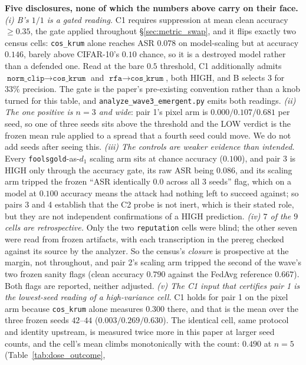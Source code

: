 \documentclass{article}
\begin{document}
\noindent \textbf{Five disclosures, none of which the numbers above carry on their face.}
\emph{(i) B's $1/1$ is a gated reading.} C1 requires suppression at mean clean accuracy
$\ge 0.35$, the gate applied throughout §\ref{sec:metric_swap}, and it flips exactly two census cells:
\texttt{cos\_krum} alone reaches ASR $0.078$ on model-scaling but at accuracy $0.146$, barely above
CIFAR-10's $0.10$ chance, so it is a destroyed model rather than a defended one. Read at the bare
$0.5$ threshold, C1 additionally admits $\texttt{norm\_clip}\to\texttt{cos\_krum}$ and
$\texttt{rfa}\to\texttt{cos\_krum}$, both HIGH, and B selects $3$ for $33\%$ precision. The gate is
the paper's pre-existing convention rather than a knob turned for this table, and
\texttt{analyze\_wave3\_emergent.py} emits both readings. \emph{(ii) The one positive is $n{=}3$ and
wide}: pair 1's pixel arm is $0.000/0.107/0.681$ per seed, so one of three seeds sits above the
threshold and the LOW verdict is the frozen mean rule applied to a spread that a fourth seed could
move. We do not add seeds after seeing this. \emph{(iii) The controls are weaker evidence than
intended.} Every \texttt{foolsgold}-as-$d_1$ scaling arm sits at chance accuracy ($0.100$), and pair
3 is HIGH only through the accuracy gate, its raw ASR being $0.086$, and its scaling arm tripped the
frozen ``ASR identically $0.0$ across all $3$ seeds'' flag, which on a model at $0.100$ accuracy means
the attack had nothing left to succeed against; so pairs 3 and 4 establish that
the C2 probe is not inert, which is their stated role, but they are not independent confirmations of
a HIGH prediction. \emph{(iv) $7$ of the $9$ cells are retrospective.} Only the two \texttt{reputation}
cells were blind; the other seven were read from frozen artifacts, with each transcription in the
prereg checked against its source by the analyzer. So the census's \emph{closure} is prospective at
the margin, not throughout, and pair 2's scaling arm tripped the second of the wave's two frozen sanity
flags (clean accuracy $0.790$ against the FedAvg reference $0.667$). Both flags are reported, neither adjusted.
\emph{(v) The C1 input that certifies pair 1 is the lowest-seed reading of a high-variance cell.} C1
holds for pair 1 on the pixel arm because \texttt{cos\_krum} alone measures $0.300$ there, and that is
the mean over the three frozen seeds $42$--$44$ ($0.003/0.269/0.630$). The identical cell, same
protocol and identity upstream, is measured twice more in this paper at larger seed counts, and the
cell's mean climbs monotonically with the count: $0.490$ at $n{=}5$ (Table~\ref{tab:dose_outcome},
\end{document}
